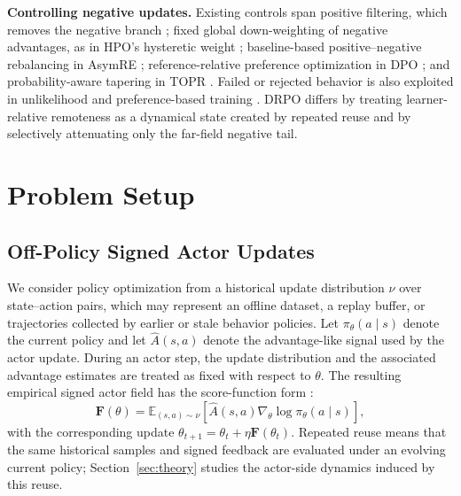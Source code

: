 \documentclass{article}
\theoremstyle{plain}
\theoremstyle{definition}
\theoremstyle{remark}
\begin{document}
\textbf{Controlling negative updates.}
Existing controls span positive filtering, which removes the negative branch
\citep{peng2019advantage,nair2020awac,kostrikov2021offline}; fixed global
down-weighting of negative advantages, as in HPO's hysteretic weight
\citep{sana2026hpo}; baseline-based positive--negative rebalancing in
AsymRE \citep{arnal2025asymmetric}; reference-relative preference
optimization in DPO \citep{rafailov2023direct}; and probability-aware
tapering in TOPR \citep{leroux2025tapered}. Failed or rejected behavior is
also exploited in unlikelihood and preference-based training
\citep{welleck2019neural,ethayarajh2024kto,duan2024negating,
zhang2024negative,zhu2025negative,song2025good}.
DRPO differs by treating learner-relative remoteness as a dynamical state
created by repeated reuse and by selectively attenuating only the far-field
negative tail.

\section{Problem Setup}
\label{sec:problem_setup}


\subsection{Off-Policy Signed Actor Updates}

We consider policy optimization from a historical update distribution
$\nu$ over state--action pairs, which may represent an offline dataset,
a replay buffer, or trajectories collected by earlier or stale behavior
policies. Let $\pi_\theta(a \mid s)$ denote the current policy and let
$\widehat{A}(s,a)$ denote the advantage-like signal used by the actor
update. During an actor step, the update distribution and the associated
advantage estimates are treated as fixed with respect to $\theta$. The resulting empirical signed actor field has the score-function form
\citep{williams1992simple,sutton2000policy}:
\begin{equation}
    \mathbf{F}(\theta)
    =
    \mathbb{E}_{(s,a)\sim\nu}
    \left[
        \widehat{A}(s,a)
        \nabla_\theta \log \pi_\theta(a \mid s)
    \right],
    \label{eq:empirical_actor_field}
\end{equation}
with the corresponding update
\(\theta_{t+1}=\theta_t+\eta\mathbf{F}(\theta_t)\).
Repeated reuse means that the same historical samples and signed feedback
are evaluated under an evolving current policy;
Section~\ref{sec:theory} studies the actor-side dynamics induced by this
reuse.
\end{document}
